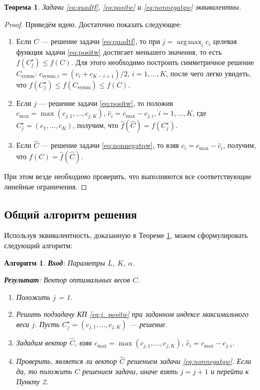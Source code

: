 \documentclass[10pt]{article}
\DeclareMathOperator*{\argmax}{arg\,max}
\newtheorem{algorithm}{Алгоритм}
\newtheorem{theorem}{Теорема}
\begin{document}
\begin{theorem} \label{th:eqivqw}
	Задачи \eqref{eq:quadtf}, \eqref{eq:positw} и \eqref{eq:nonnegatqw}  эквивалентны.
\end{theorem}
\begin{proof}
	Приведём идею. Достаточно показать следующее:
	\begin{enumerate}
		\item Если $C$ --- решение задачи \eqref{eq:quadtf}, то при $j = \argmax_i c_i$ целевая функция задачи \eqref{eq:positw} достигает меньшего значения, то есть $f(C_j^\star) \le f(C)$. Для этого необходимо построить симметричное решение $C_\text{symm}$: $c_{\text{symm}, i} = (c_i + c_{K - i + 1})/2$, $i = 1, \ldots, K$, после чего легко увидеть, что $f(C_j^\star) \le f(C_\text{symm}) \le f(C)$.
		\item Если $j$ --- решение задачи \eqref{eq:positw}, то положив $c_\text{max} = \max(c_{j, 1}, \ldots, c_{j, K})$, $\hat c_i = c_\text{max} - c_{j, i}$, $i = 1, \ldots, K$, где $C_j^\star = (c_1, \ldots, c_K)$, получим, что $\hat f(\hat C) = f(C^\star_j)$.
		\item Если $\hat C$ --- решение задачи \eqref{eq:nonnegatqw}, то взяв $c_i =c_\text{max} - \hat c_i$, получим, что $f(C) = \hat f(\hat C)$.
	\end{enumerate}
	
	При этом везде необходимо проверить, что выполняются все соответствующие линейные ограничения.
\end{proof}


\subsection{Общий алгоритм решения}
Используя эквивалентность, доказанную в Теореме \ref{th:eqivqw}, можем сформулировать следующий алгоритм:

\begin{algorithm}
	\label{alg:solveqw}
	\textbf{Вход}: Параметры $L$, $K$, $\alpha$.
	
	\textbf{Результат}:
	Вектор оптимальных весов $C$.
	
	\begin{enumerate}
		\item Положить $j$ = 1.
		\item Решить подзадачу КП \eqref{eq:j_positw} при заданном индексе максимального веса $j$. Пусть $C^\star_j = (c_{j, 1}, \ldots, c_{j, K})$ --- решение.
		\item Зададим вектор $\widehat C$, взяв $c_\text{max} = \max(c_{j, 1}, \ldots, c_{j, K})$, $\hat c_i = c_\text{max} - c_{j, i}$.
		\item Проверить, является ли вектор $\widehat C$ решением задачи \eqref{eq:nonnegatqw}. Если да, то положить $C$ решением задачи, иначе взять $j = j + 1$ и перейти к Пункту 2.
	\end{enumerate}
\end{algorithm}
\end{document}
